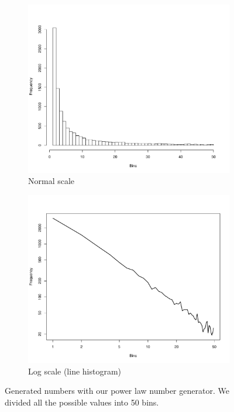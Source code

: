 \begin{figure}[hbtp]
    \centering
    \begin{subfigure}[b]{0.45\textwidth}
        \centering
          \includegraphics[width=\textwidth]{../img/power_law.pdf}
          \caption{Normal scale}
    \end{subfigure}
    \hspace{0.08\textwidth}
    \begin{subfigure}[b]{0.45\textwidth}
        \centering
          \includegraphics[width=\textwidth]{../img/power_law_log.pdf}
          \caption{Log scale (line histogram)}
    \end{subfigure}
    \caption{Generated numbers with our power law number generator. We divided all the possible values into 50 bins.}
    \label{fig:powerlaw}
\end{figure}



